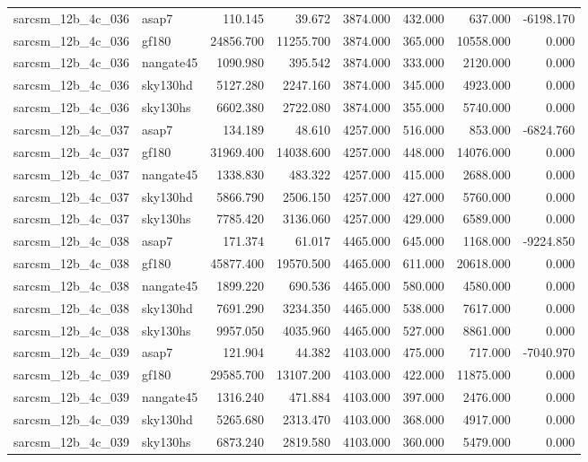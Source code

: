 \begin{tabular}{llrrrrrr}
sarcsm\_12b\_4c\_036 & asap7 & 110.145 & 39.672 & 3874.000 & 432.000 & 637.000 & -6198.170 \\
sarcsm\_12b\_4c\_036 & gf180 & 24856.700 & 11255.700 & 3874.000 & 365.000 & 10558.000 & 0.000 \\
sarcsm\_12b\_4c\_036 & nangate45 & 1090.980 & 395.542 & 3874.000 & 333.000 & 2120.000 & 0.000 \\
sarcsm\_12b\_4c\_036 & sky130hd & 5127.280 & 2247.160 & 3874.000 & 345.000 & 4923.000 & 0.000 \\
sarcsm\_12b\_4c\_036 & sky130hs & 6602.380 & 2722.080 & 3874.000 & 355.000 & 5740.000 & 0.000 \\
sarcsm\_12b\_4c\_037 & asap7 & 134.189 & 48.610 & 4257.000 & 516.000 & 853.000 & -6824.760 \\
sarcsm\_12b\_4c\_037 & gf180 & 31969.400 & 14038.600 & 4257.000 & 448.000 & 14076.000 & 0.000 \\
sarcsm\_12b\_4c\_037 & nangate45 & 1338.830 & 483.322 & 4257.000 & 415.000 & 2688.000 & 0.000 \\
sarcsm\_12b\_4c\_037 & sky130hd & 5866.790 & 2506.150 & 4257.000 & 427.000 & 5760.000 & 0.000 \\
sarcsm\_12b\_4c\_037 & sky130hs & 7785.420 & 3136.060 & 4257.000 & 429.000 & 6589.000 & 0.000 \\
sarcsm\_12b\_4c\_038 & asap7 & 171.374 & 61.017 & 4465.000 & 645.000 & 1168.000 & -9224.850 \\
sarcsm\_12b\_4c\_038 & gf180 & 45877.400 & 19570.500 & 4465.000 & 611.000 & 20618.000 & 0.000 \\
sarcsm\_12b\_4c\_038 & nangate45 & 1899.220 & 690.536 & 4465.000 & 580.000 & 4580.000 & 0.000 \\
sarcsm\_12b\_4c\_038 & sky130hd & 7691.290 & 3234.350 & 4465.000 & 538.000 & 7617.000 & 0.000 \\
sarcsm\_12b\_4c\_038 & sky130hs & 9957.050 & 4035.960 & 4465.000 & 527.000 & 8861.000 & 0.000 \\
sarcsm\_12b\_4c\_039 & asap7 & 121.904 & 44.382 & 4103.000 & 475.000 & 717.000 & -7040.970 \\
sarcsm\_12b\_4c\_039 & gf180 & 29585.700 & 13107.200 & 4103.000 & 422.000 & 11875.000 & 0.000 \\
sarcsm\_12b\_4c\_039 & nangate45 & 1316.240 & 471.884 & 4103.000 & 397.000 & 2476.000 & 0.000 \\
sarcsm\_12b\_4c\_039 & sky130hd & 5265.680 & 2313.470 & 4103.000 & 368.000 & 4917.000 & 0.000 \\
sarcsm\_12b\_4c\_039 & sky130hs & 6873.240 & 2819.580 & 4103.000 & 360.000 & 5479.000 & 0.000 \\

\end{tabular}
